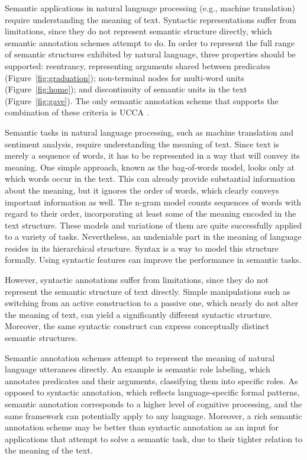 \documentclass[12pt,a4paper]{report}
\begin{document}
Semantic applications in natural language processing (e.g., machine translation)
require understanding the meaning of text.
Syntactic representations suffer from limitations, since they do not
represent semantic structure directly,
which semantic annotation schemes attempt to do.
In order to represent the full range of semantic structures exhibited by
natural language, three properties should be supported: reentrancy,
representing arguments shared between predicates (Figure~\ref{fig:graduation});
non-terminal nodes for multi-word units (Figure~\ref{fig:home});
and discontinuity of semantic units in the text (Figure~\ref{fig:gave}).
The only semantic annotation scheme that supports the combination of these criteria is UCCA
\citep{abend2013universal}.


Semantic tasks in natural language processing, such as machine translation and
sentiment analysis, require understanding the meaning of text. Since text is
merely a sequence of words, it has to be represented in a way that will convey
its meaning. One simple approach, known as the bag-of-words model, looks only
at which words occur in the text. This can already provide
substantial information about the meaning, but it ignores the order of words,
which clearly conveys important information as well. The n-gram model counts
sequences of words with regard to their order, incorporating at least some of
the meaning encoded in the text structure. These models and variations of them
are quite successfully applied to a variety of
tasks\cite{mikolov2013efficient}. Nevertheless, an undeniable part in the
meaning of language resides in its hierarchical structure. Syntax is a way to
model this structure formally. Using syntactic features can improve the
performance in semantic tasks\cite{vandeghinste2013parse}.

However, syntactic annotations suffer from limitations, since they do not
represent the semantic structure of text directly. Simple manipulations such as
switching from an active construction to a passive one, which nearly do not
alter the meaning of text, can yield a significantly different syntactic
structure. Moreover, the same syntactic construct can express conceptually
distinct semantic structures\cite{abend2013ucca}.

Semantic annotation schemes attempt to represent the meaning of natural
language utterances directly. An example is semantic role
labeling\cite{baker1998framenet}\cite{paass2014semantic}, which annotates
predicates and their arguments, classifying them into specific roles. As
opposed to syntactic annotation, which reflects language-specific formal
patterns, semantic annotation corresponds to a higher level of cognitive
processing, and the same framework can potentially apply to any language.
Moreover, a rich semantic annotation scheme may be better than
syntactic annotation as an input for applications that attempt to solve a
semantic task, due to their tighter relation to the meaning of the text.
\end{document}

